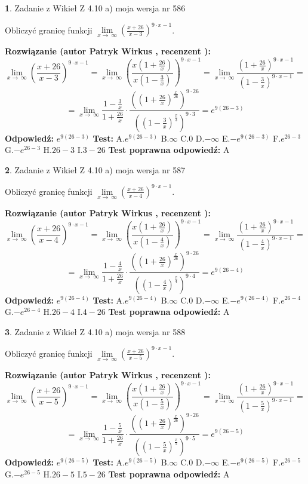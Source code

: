 \documentclass[12pt, a4paper]{article}
\theoremstyle{definition} %
\newtheorem{zad}{}
\newcommand{\zadStart}[1]{\begin{zad}#1\newline}
\newcommand{\zadStop}{\end{zad}}
\newcommand{\rozwStart}[2]{\noindent \textbf{Rozwiązanie (autor #1 , recenzent #2): }\newline}
\newcommand{\rozwStop}{\newline}
\newcommand{\odpStart}{\noindent \textbf{Odpowiedź:}\newline}
\newcommand{\odpStop}{\newline}
\newcommand{\testStart}{\noindent \textbf{Test:}\newline}
\newcommand{\testStop}{\newline}
\newcommand{\kluczStart}{\noindent \textbf{Test poprawna odpowiedź:}\newline}
\newcommand{\kluczStop}{\newline}
\begin{document}
\zadStart{Zadanie z Wikieł Z 4.10 a) moja wersja nr 586}


Obliczyć granicę funkcji  $\lim\limits_{x\to\ \infty}(\frac{x+26}{x-3})^{9\cdot x-1}$.
\zadStop
\rozwStart{Patryk Wirkus}{}
$$\lim\limits_{x\to\ \infty}(\frac{x+26}{x-3})^{9\cdot x-1} = \lim\limits_{x\to\ \infty}(\frac{x(1+\frac{26}{x})}{x(1-\frac{3}{x})})^{9\cdot x-1}=\lim\limits_{x\to\ \infty}\frac{(1+\frac{26}{x})^{9\cdot x-1}}{(1-\frac{3}{x})^{9\cdot x-1}}=$$
$$=\lim\limits_{x\to\ \infty}\frac{1-\frac{3}{x}}{1+\frac{26}{x}}\cdot\frac{((1+\frac{26}{x})^{\frac{x}{26}})^{9\cdot26}}{((1-\frac{3}{x})^{\frac{x}{3}})^{9\cdot3}}=e^{9(26-3)}$$
\rozwStop
\odpStart
$e^{9(26-3)}$
\odpStop
\testStart
A.$e^{9(26-3)}$ B.$\infty$ C.$0$ D.$-\infty$ E.$-e^{9(26-3)}$
F.$e^{26-3}$ G.$-e^{26-3}$
H.$26-3$
I.$3-26$
\testStop
\kluczStart
A
\kluczStop



\zadStart{Zadanie z Wikieł Z 4.10 a) moja wersja nr 587}


Obliczyć granicę funkcji  $\lim\limits_{x\to\ \infty}(\frac{x+26}{x-4})^{9\cdot x-1}$.
\zadStop
\rozwStart{Patryk Wirkus}{}
$$\lim\limits_{x\to\ \infty}(\frac{x+26}{x-4})^{9\cdot x-1} = \lim\limits_{x\to\ \infty}(\frac{x(1+\frac{26}{x})}{x(1-\frac{4}{x})})^{9\cdot x-1}=\lim\limits_{x\to\ \infty}\frac{(1+\frac{26}{x})^{9\cdot x-1}}{(1-\frac{4}{x})^{9\cdot x-1}}=$$
$$=\lim\limits_{x\to\ \infty}\frac{1-\frac{4}{x}}{1+\frac{26}{x}}\cdot\frac{((1+\frac{26}{x})^{\frac{x}{26}})^{9\cdot26}}{((1-\frac{4}{x})^{\frac{x}{4}})^{9\cdot4}}=e^{9(26-4)}$$
\rozwStop
\odpStart
$e^{9(26-4)}$
\odpStop
\testStart
A.$e^{9(26-4)}$ B.$\infty$ C.$0$ D.$-\infty$ E.$-e^{9(26-4)}$
F.$e^{26-4}$ G.$-e^{26-4}$
H.$26-4$
I.$4-26$
\testStop
\kluczStart
A
\kluczStop



\zadStart{Zadanie z Wikieł Z 4.10 a) moja wersja nr 588}


Obliczyć granicę funkcji  $\lim\limits_{x\to\ \infty}(\frac{x+26}{x-5})^{9\cdot x-1}$.
\zadStop
\rozwStart{Patryk Wirkus}{}
$$\lim\limits_{x\to\ \infty}(\frac{x+26}{x-5})^{9\cdot x-1} = \lim\limits_{x\to\ \infty}(\frac{x(1+\frac{26}{x})}{x(1-\frac{5}{x})})^{9\cdot x-1}=\lim\limits_{x\to\ \infty}\frac{(1+\frac{26}{x})^{9\cdot x-1}}{(1-\frac{5}{x})^{9\cdot x-1}}=$$
$$=\lim\limits_{x\to\ \infty}\frac{1-\frac{5}{x}}{1+\frac{26}{x}}\cdot\frac{((1+\frac{26}{x})^{\frac{x}{26}})^{9\cdot26}}{((1-\frac{5}{x})^{\frac{x}{5}})^{9\cdot5}}=e^{9(26-5)}$$
\rozwStop
\odpStart
$e^{9(26-5)}$
\odpStop
\testStart
A.$e^{9(26-5)}$ B.$\infty$ C.$0$ D.$-\infty$ E.$-e^{9(26-5)}$
F.$e^{26-5}$ G.$-e^{26-5}$
H.$26-5$
I.$5-26$
\testStop
\kluczStart
A
\kluczStop
\end{document}
